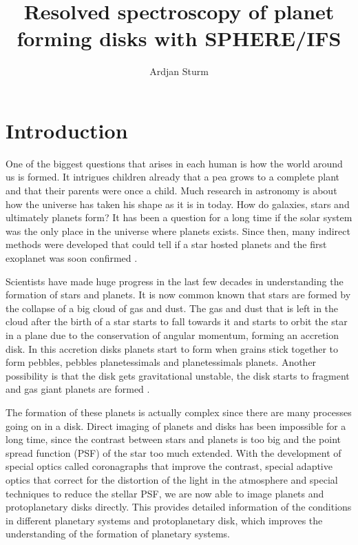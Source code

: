 \documentclass[twoside,single]{lion-msc}
\title{Resolved spectroscopy of planet forming disks with SPHERE/IFS}
\author{Ardjan Sturm}
\affiliation{Huygens-Kamerlingh Onnes Laboratory, Leiden University}   %
\begin{document}

\maketitle

\tableofcontents
\cleardoublepage



\chapter{Introduction}
One of the biggest questions that arises in each human is how the world around us is formed. It intrigues children already that a pea grows to a complete plant and that their parents were once a child. Much research in astronomy is about how the universe has taken his shape as it is in today. How do galaxies, stars and ultimately planets form? It has been a question for a long time if the solar system was the only place in the universe where planets exists. Since then, many indirect methods were developed that could tell if a star hosted planets and the first exoplanet was soon confirmed \cite{Mayor1995}.
\bigskip

Scientists have made huge progress in the last few decades in understanding the formation of stars and planets. It is now common known that stars are formed by the collapse of a big cloud of gas and dust. The gas and dust that is left in the cloud after the birth of a star starts to fall towards it and starts to orbit the star in a plane due to the conservation of angular momentum, forming an accretion disk. In this accretion disks planets start to form when grains stick together to form pebbles, pebbles planetessimals and planetessimals planets. Another possibility is that the disk gets gravitational unstable, the disk starts to fragment and gas giant planets are formed \cite{Armitage2010}.
\bigskip

The formation of these planets is actually complex since there are many processes going on in a disk. Direct imaging of planets and disks has been impossible for a long time, since the contrast between stars and planets is too big and the point spread function (PSF) of the star too much extended. With the development of special optics called coronagraphs that improve the contrast, special adaptive optics that correct for the distortion of the light in the atmosphere and special techniques to reduce the stellar PSF, we are now able to image planets and protoplanetary disks directly. This provides detailed information of the conditions in different planetary systems and protoplanetary disk, which improves the understanding of the formation of planetary systems.
\bigskip
\end{document}
